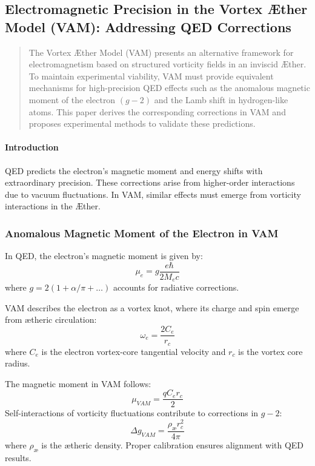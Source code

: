 

\subsection{Electromagnetic Precision in the Vortex Æther Model (VAM): Addressing QED Corrections}\label{subsec:electromagnetic-precision-in-the-vortex-ae-ther-model-(vam):-addressing-qed-corrections}


\begin{abstract}
    The Vortex Æther Model (VAM) presents an alternative framework for electromagnetism based on structured vorticity fields in an inviscid Æther. To maintain experimental viability, VAM must provide equivalent mechanisms for high-precision QED effects such as the anomalous magnetic moment of the electron $(g-2)$ and the Lamb shift in hydrogen-like atoms. This paper derives the corresponding corrections in VAM and proposes experimental methods to validate these predictions.
\end{abstract}

\paragraph*{Introduction}
QED predicts the electron's magnetic moment and energy shifts with extraordinary precision. These corrections arise from higher-order interactions due to vacuum fluctuations. In VAM, similar effects must emerge from vorticity interactions in the Æther.

\subsubsection*{Anomalous Magnetic Moment of the Electron in VAM}
In QED, the electron's magnetic moment is given by:
\begin{equation*}
    \mu_e = g \frac{e\hbar}{2M_e c}
\end{equation*}
where $g = 2(1 + \alpha / \pi + \dots)$ accounts for radiative corrections.

VAM describes the electron as a vortex knot, where its charge and spin emerge from ætheric circulation:
\begin{equation*}
    \omega_e = \frac{2 C_e}{r_c}
\end{equation*}
where $C_e$ is the electron vortex-core tangential velocity and $r_c$ is the vortex core radius.

The magnetic moment in VAM follows:
\begin{equation*}
    \mu_{VAM} = \frac{q C_e r_c}{2}
\end{equation*}
Self-interactions of vorticity fluctuations contribute to corrections in $g-2$:
\begin{equation*}
    \Delta g_{VAM} = \frac{\rho_{\text{\ae}} r_c^2}{4\pi}
\end{equation*}
where $\rho_{\text{\ae}}$ is the ætheric density. Proper calibration ensures alignment with QED results.

